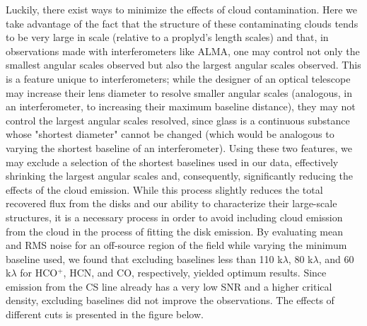 Luckily, there exist ways to minimize the effects of cloud contamination. Here we take advantage of the fact that the structure of these contaminating clouds tends to be very large in scale (relative to a proplyd's length scales) and that, in observations made with interferometers like ALMA, one may control not only the smallest angular scales observed but also the largest angular scales observed. This is a feature unique to interferometers; while the designer of an optical telescope may increase their lens diameter to resolve smaller angular scales (analogous, in an interferometer, to increasing their maximum baseline distance), they may not control the largest angular scales resolved, since glass is a continuous substance whose "shortest diameter" cannot be changed (which would be analogous to varying the shortest baseline of an interferometer). Using these two features, we may exclude a selection of the shortest baselines used in our data, effectively shrinking the largest angular scales and, consequently, significantly reducing the effects of the cloud emission. While this process slightly reduces the total recovered flux from the disks and our ability to characterize their large-scale structures, it is a necessary process in order to avoid including cloud emission from the cloud in the process of fitting the disk emission. By evaluating mean and RMS noise for an off-source region of the field while varying the minimum baseline used, we found that excluding baselines less than 110 k$\lambda$, 80 k$\lambda$, and 60  k$\lambda$ for HCO$^{+}$, HCN, and CO, respectively, yielded optimum results. Since emission from the CS line already has a very low SNR and a higher critical density, excluding baselines did not improve the observations. The effects of different cuts is presented in the figure below.

\bigskip
\bigskip

